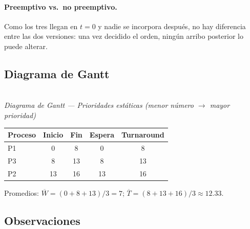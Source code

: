 \documentclass[11pt,a4paper]{article}
\begin{document}
\paragraph{Preemptivo vs.\ no preemptivo.} Como los tres llegan en
$t = 0$ y nadie se incorpora después, no hay diferencia entre las dos
versiones: una vez decidido el orden, ningún arribo posterior lo
puede alterar.

\subsection*{Diagrama de Gantt}

\begin{center}
\\\small\emph{Diagrama de Gantt --- Prioridades estáticas (menor número $\to$ mayor prioridad)}
\end{center}

\begin{center}
\small
\begin{tabular}{@{}lcccc@{}}
\toprule
Proceso & Inicio & Fin & Espera & Turnaround \\
\midrule
P1 & 0  & 8  & 0  & 8  \\
P3 & 8  & 13 & 8  & 13 \\
P2 & 13 & 16 & 13 & 16 \\
\bottomrule
\end{tabular}
\end{center}

Promedios:
$\overline{W} = (0 + 8 + 13)/3 = 7$;
$\overline{T} = (8 + 13 + 16)/3 \approx 12{.}33$.

\subsection*{Observaciones}
\end{document}
